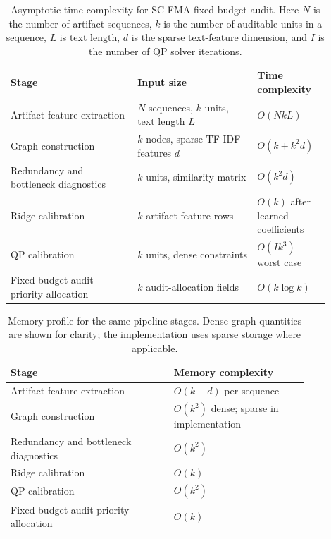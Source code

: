 \documentclass[a4paper,fleqn]{cas-sc}
\begin{document}
\begin{table}[ht]
\caption{Asymptotic time complexity for SC-FMA fixed-budget audit. Here $N$ is the number of artifact sequences, $k$ is the number of auditable units in a sequence, $L$ is text length, $d$ is the sparse text-feature dimension, and $I$ is the number of QP solver iterations.}
\label{tab:complexity-summary}
\centering
\small
\renewcommand{\arraystretch}{1.08}
\begin{tabular}{p{0.36\linewidth}p{0.34\linewidth}p{0.20\linewidth}}
\toprule
\textbf{Stage} & \textbf{Input size} & \textbf{Time complexity} \\
\midrule
Artifact feature extraction & $N$ sequences, $k$ units, text length $L$ & $O(NkL)$ \\
Graph construction & $k$ nodes, sparse TF-IDF features $d$ & $O(k+k^2d)$ \\
Redundancy and bottleneck diagnostics & $k$ units, similarity matrix & $O(k^2d)$ \\
Ridge calibration & $k$ artifact-feature rows & $O(k)$ after learned coefficients \\
QP calibration & $k$ units, dense constraints & $O(Ik^3)$ worst case \\
Fixed-budget audit-priority allocation & $k$ audit-allocation fields & $O(k\log k)$ \\
\bottomrule
\end{tabular}
\end{table}

\begin{table}[ht]
\caption{Memory profile for the same pipeline stages. Dense graph quantities are shown for clarity; the implementation uses sparse storage where applicable.}
\label{tab:memory-summary}
\centering
\small
\renewcommand{\arraystretch}{1.08}
\begin{tabular}{p{0.46\linewidth}p{0.38\linewidth}}
\toprule
\textbf{Stage} & \textbf{Memory complexity} \\
\midrule
Artifact feature extraction & $O(k+d)$ per sequence \\
Graph construction & $O(k^2)$ dense; sparse in implementation \\
Redundancy and bottleneck diagnostics & $O(k^2)$ \\
Ridge calibration & $O(k)$ \\
QP calibration & $O(k^2)$ \\
Fixed-budget audit-priority allocation & $O(k)$ \\
\bottomrule
\end{tabular}
\end{table}
\end{document}
